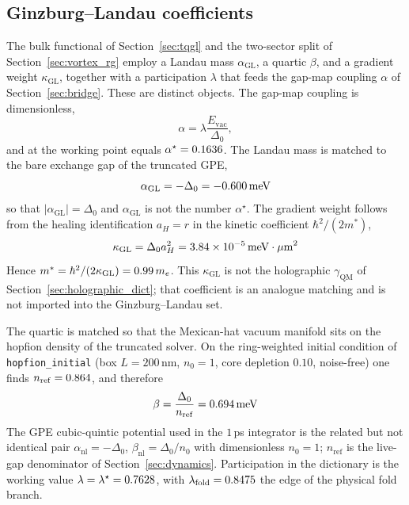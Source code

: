 \subsection{Ginzburg--Landau coefficients}
\label{sec:gl_dict}

The bulk functional of Section~\ref{sec:tqgl} and the two-sector split of Section~\ref{sec:vortex_rg} employ a Landau mass $\alpha_{\mathrm{GL}}$, a quartic $\beta$, and a gradient weight $\kappa_{\mathrm{GL}}$, together with a participation $\lambda$ that feeds the gap-map coupling $\alpha$ of Section~\ref{sec:bridge}. These are distinct objects. The gap-map coupling is dimensionless,
\begin{equation}
\alpha=\lambda\frac{E_{\mathrm{vac}}}{\Delta_0},
\end{equation}
and at the working point equals $\alpha^\star=0.1636$. The Landau mass is matched to the bare exchange gap of the truncated GPE,
\begin{equation}
\alpha_{\mathrm{GL}}=-\Delta_0=-0.600\,\mathrm{meV}
\end{equation}
so that $|\alpha_{\mathrm{GL}}|=\Delta_0$ and $\alpha_{\mathrm{GL}}$ is not the number $\alpha^\star$. The gradient weight follows from the healing identification $a_H=r$ in the kinetic coefficient $\hbar^2/(2m^*)$,
\begin{equation}
\kappa_{\mathrm{GL}}=\Delta_0 a_H^2=3.84\times 10^{-5}\,\mathrm{meV\cdot\mu m}^{2}
\end{equation}
Hence $m^*=\hbar^2/(2\kappa_{\mathrm{GL}})=0.99\,m_e$. This $\kappa_{\mathrm{GL}}$ is not the holographic $\gamma_{\mathrm{QM}}$ of Section~\ref{sec:holographic_dict}; that coefficient is an analogue matching and is not imported into the Ginzburg--Landau set.

The quartic is matched so that the Mexican-hat vacuum manifold sits on the hopfion density of the truncated solver. On the ring-weighted initial condition of \texttt{hopfion\_initial} (box $L=200$\,nm, $n_0=1$, core depletion $0.10$, noise-free) one finds $n_{\mathrm{ref}}=0.864$, and therefore
\begin{equation}
\beta=\frac{\Delta_0}{n_{\mathrm{ref}}}=0.694\,\mathrm{meV}
\end{equation}
The GPE cubic-quintic potential used in the $1$\,ps integrator is the related but not identical pair $\alpha_{\mathrm{nl}}=-\Delta_0$, $\beta_{\mathrm{nl}}=\Delta_0/n_0$ with dimensionless $n_0=1$; $n_{\mathrm{ref}}$ is the live-gap denominator of Section~\ref{sec:dynamics}. Participation in the dictionary is the working value $\lambda=\lambda^\star=0.7628$, with $\lambda_{\mathrm{fold}}=0.8475$ the edge of the physical fold branch.

